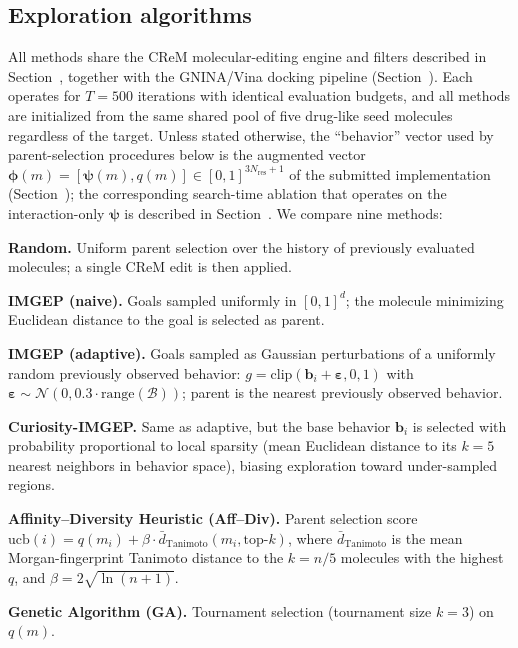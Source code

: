 \documentclass[journal=jcisd8,manuscript=article]{achemso}
\begin{document}
\subsection{Exploration algorithms}

All methods share the CReM molecular-editing engine and filters described in Section~, together with the GNINA/Vina docking pipeline (Section~). Each operates for $T = 500$ iterations with identical evaluation budgets, and all methods are initialized from the same shared pool of five drug-like seed molecules regardless of the target. Unless stated otherwise, the ``behavior'' vector used by parent-selection procedures below is the augmented vector $\boldsymbol{\phi}(m) = [\boldsymbol{\psi}(m), q(m)] \in [0,1]^{3N_{\mathrm{res}}+1}$ of the submitted implementation (Section~); the corresponding search-time ablation that operates on the interaction-only $\boldsymbol{\psi}$ is described in Section~. We compare nine methods:

\textbf{Random.} Uniform parent selection over the history of previously evaluated molecules; a single CReM edit is then applied.

\textbf{IMGEP (naive).} Goals sampled uniformly in $[0,1]^d$; the molecule minimizing Euclidean distance to the goal is selected as parent.

\textbf{IMGEP (adaptive).} Goals sampled as Gaussian perturbations of a uniformly random previously observed behavior: $g = \text{clip}(\boldsymbol{b}_i + \boldsymbol{\varepsilon}, 0, 1)$ with $\boldsymbol{\varepsilon} \sim \mathcal{N}(0, 0.3 \cdot \text{range}(\mathcal{B}))$; parent is the nearest previously observed behavior.

\textbf{Curiosity-IMGEP.} Same as adaptive, but the base behavior $\boldsymbol{b}_i$ is selected with probability proportional to local sparsity (mean Euclidean distance to its $k=5$ nearest neighbors in behavior space), biasing exploration toward under-sampled regions.

\textbf{Affinity--Diversity Heuristic (Aff--Div).} Parent selection score $\text{ucb}(i) = q(m_i) + \beta \cdot \bar{d}_\text{Tanimoto}(m_i, \text{top-}k)$, where $\bar{d}_\text{Tanimoto}$ is the mean Morgan-fingerprint Tanimoto distance to the $k = n/5$ molecules with the highest $q$, and $\beta = 2\sqrt{\ln(n+1)}$.

\textbf{Genetic Algorithm (GA).} Tournament selection (tournament size $k = 3$) on $q(m)$.
\end{document}
